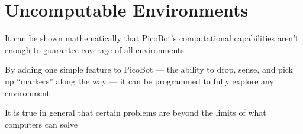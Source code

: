 \documentclass[8pt,a4paper,compress]{beamer}
\begin{document}
\section{Uncomputable Environments}
\begin{frame}[fragile]

It can be shown mathematically that PicoBot's computational capabilities aren't enough to guarantee coverage of all environments


\bigskip

By adding one simple feature to PicoBot --- the ability to drop, sense, and pick up ``markers'' along the way --- it can be programmed to fully explore any environment


\bigskip

It is true in general that certain problems are beyond the limits of what computers can solve
\end{frame}
\end{document}
